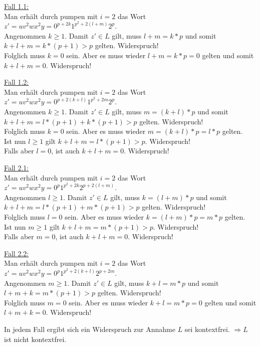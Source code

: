 	\underline{Fall 1.1:}\\
	Man erhält durch pumpen mit $i = 2$ das Wort $z'=uv^2wx^2y=0^{p+2k}1^{p^2+2(l+m)}2^{p}$.\\
	Angenommen $k\geq 1$. Damit $z' \in L$ gilt, muss $l+m = k*p$ und somit $k+l+m=k*(p+1)>p$ gelten. Widerspruch!\\
	Folglich muss $k=0$ sein. Aber es muss wieder $l+m = k*p = 0$ gelten und somit $k+l+m=0$. Widerspruch!

	\underline{Fall 1.2:}\\
	Man erhält durch pumpen mit $i = 2$ das Wort $z'=uv^2wx^2y=0^{p+2(k+l)}1^{p^2+2m}2^{p}$.\\
	Angenommen $k\geq 1$. Damit $z' \in L$ gilt, muss $m = (k+l)*p$ und somit $k+l+m=l*(p+1)+k*(p+1)>p$ gelten. Widerspruch!\\
	Folglich muss $k=0$ sein. Aber es muss wieder $m = (k+l)*p = l*p$ gelten.\\
	Ist nun $l\geq 1$ gilt $k+l+m=l*(p+1)>p$. Widerspruch!\\
	Falls aber $l=0$, ist auch $k+l+m=0$. Widerspruch!

	\underline{Fall 2.1:}\\
	Man erhält durch pumpen mit $i = 2$ das Wort $z'=uv^2wx^2y=0^{p}1^{p^2+2k}2^{p+2(l+m)}$.\\
	Angenommen $l\geq 1$. Damit $z' \in L$ gilt, muss $k = (l+m)*p$ und somit $k+l+m=l*(p+1)+m*(p+1)>p$ gelten. Widerspruch!\\
	Folglich muss $l=0$ sein. Aber es muss wieder $k = (l+m)*p = m*p$ gelten.\\
	Ist nun $m\geq 1$ gilt $k+l+m=m*(p+1)>p$. Widerspruch!\\
	Falls aber $m=0$, ist auch $k+l+m=0$. Widerspruch!

	\underline{Fall 2.2:}\\
	Man erhält durch pumpen mit $i = 2$ das Wort $z'=uv^2wx^2y=0^{p}1^{p^2+2(k+l)}2^{p+2m}$.\\
	Angenommen $m\geq 1$. Damit $z' \in L$ gilt, muss $k+l = m*p$ und somit $l+m+k=m*(p+1)>p$ gelten. Widerspruch!\\
	Folglich muss $m=0$ sein. Aber es muss wieder $k+l = m*p = 0$ gelten und somit $l+m+k=0$. Widerspruch!

	In jedem Fall ergibt sich ein Widerspruch zur Annahme $L$ sei kontextfrei. $\Rightarrow L$ ist nicht kontextfrei.
		


\newpage
